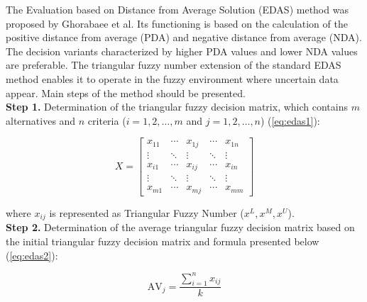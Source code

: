 The Evaluation based on Distance from Average Solution (EDAS) method was proposed by Ghorabaee et al. Its functioning is based on the calculation of the positive distance from average (PDA) and negative distance from average (NDA). The decision variants characterized by higher PDA values and lower NDA values are preferable. The triangular fuzzy number extension of the standard EDAS method enables it to operate in the fuzzy environment where uncertain data appear. Main steps of the method should be presented.  \\

\noindent \textbf{Step 1.} Determination of the triangular fuzzy decision matrix, which contains $m$ alternatives and $n$ criteria ($i = 1, 2, \ldots, m$ and $j = 1, 2, \ldots, n$) (\ref{eq:edas1}):

\begin{equation}
X=\left[\begin{array}{ccccc}
x_{11} & \cdots & x_{1 j} & \cdots & x_{1 n} \\
\vdots & \ddots & \vdots & \ddots & \vdots \\
x_{i 1} & \cdots & x_{i j} & \cdots & x_{i n} \\
\vdots & \ddots & \vdots & \ddots & \vdots \\
x_{m 1} & \cdots & x_{m j} & \cdots & x_{m m}
\end{array}\right]
\label{eq:edas1}
\end{equation}

\noindent where $x_{ij}$ is represented as Triangular Fuzzy Number ($x^L, x^M, x^U$). \\



\noindent \textbf{Step 2.} Determination of the average triangular fuzzy decision matrix based on the initial triangular fuzzy decision matrix and formula presented below (\ref{eq:edas2}):

\begin{equation}
\mathrm{AV}_j=\frac{\sum_{i=1}^n x_{i j}}{k}
\label{eq:edas2}
\end{equation}

